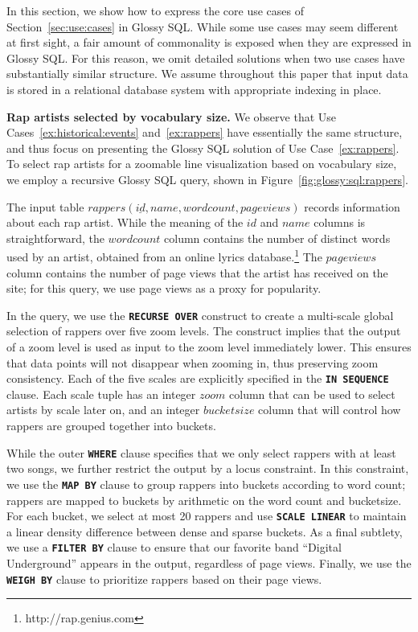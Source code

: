 \documentclass[11pt, oneside]{report}
\newcommand{\minisec}[1]{\noindent\textbf{#1.}}
\begin{document}
In this section, we show how to express the core use cases of Section~\ref{sec:use:cases} in Glossy SQL. While some use cases may seem different at first sight, a fair amount of commonality is exposed when they are expressed in Glossy SQL. For this reason, we omit detailed solutions when two use cases have substantially similar structure. 
We assume throughout this paper that input data is stored in a relational database system with appropriate indexing in place.  

\minisec{Rap artists selected by vocabulary size}
We observe that Use Cases~\ref{ex:historical:events} and~\ref{ex:rappers} have essentially the same structure, and thus focus on presenting the Glossy SQL solution of Use Case~\ref{ex:rappers}.
To select rap artists for a zoomable line visualization based on vocabulary size, we employ a recursive Glossy SQL query, shown in Figure~\ref{fig:glossy:sql:rappers}. 

The input table $rappers(\underline{id}, name, wordcount, pageviews)$ records information about each rap artist. While the meaning of the $id$ and $name$ columns is straightforward, the $wordcount$ column contains the number of distinct words used by an artist, obtained from an online lyrics database.\footnote{http://rap.genius.com} The $pageviews$ column contains the number of page views that the artist has received on the site; for this query, we use page views as a proxy for popularity.

In the query, we use the \textbf{\texttt{RECURSE OVER}} construct to create a multi-scale global selection of rappers over five zoom levels. The construct implies that the output of a zoom level is used as input to the zoom level immediately lower. This ensures that data points will not disappear when zooming in, thus preserving zoom consistency. Each of the five scales are explicitly specified in the \textbf{\texttt{IN SEQUENCE}} clause. Each scale tuple has an integer $zoom$ column that can be used to select artists by scale later on, and an integer $bucketsize$ column that will control how rappers are grouped together into buckets.

While the outer \textbf{\texttt{WHERE}} clause specifies that we only select rappers with at least two songs, we further restrict the output by a locus constraint. In this constraint, we use the \textbf{\texttt{MAP BY}} clause to group rappers into buckets according to word count; rappers are mapped to buckets by arithmetic on the word count and bucketsize. For each bucket, we select at most 20 rappers and use \textbf{\texttt{SCALE LINEAR}} to maintain a linear density difference between dense and sparse buckets. As a final subtlety, we use a \textbf{\texttt{FILTER BY}} clause to ensure that our favorite band ``Digital Underground''  appears in the output, regardless of page views. Finally, we use the \textbf{\texttt{WEIGH BY}} clause to prioritize rappers based on their page views. 
\end{document}
